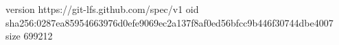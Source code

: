 version https://git-lfs.github.com/spec/v1
oid sha256:0287ea85954663976d0efe9069ec2a137f8af0ed56bfcc9b446f30744dbe4007
size 699212
